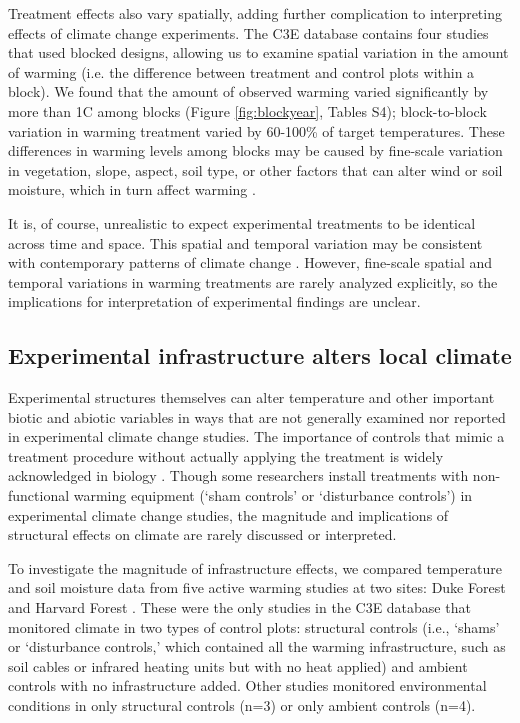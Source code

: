 \documentclass{article}
\begin{document}
\par Treatment effects also vary spatially, adding further complication to interpreting effects of climate change experiments. The C3E database contains four studies that used blocked designs, allowing us to examine spatial variation in the amount of warming (i.e. the difference between treatment and control plots within a block). We found that the amount of observed warming varied significantly by more than 1\degree C among blocks (Figure \ref{fig:blockyear}, Tables S4); block-to-block variation in warming treatment varied by 60-100\% of target temperatures. These differences in warming levels among blocks may be caused by fine-scale variation in vegetation, slope, aspect, soil type, or other factors that can alter wind or soil moisture, which in turn affect warming \citep{peterjohn1993,kimball2005,kimball2008,hoeppner2012,rollinson2015}. 
\par It is, of course, unrealistic to expect experimental treatments to be identical across time and space.  This spatial and temporal variation may be consistent with contemporary patterns of climate change  \citep{ipcc2013}. However, fine-scale spatial and temporal variations in warming treatments are rarely analyzed explicitly, so the implications for interpretation of experimental findings are unclear. %

\subsection* {Experimental infrastructure alters local climate}
Experimental structures themselves can alter temperature and other important biotic and abiotic variables in ways that are not generally examined nor reported in experimental climate change studies. The importance of controls that mimic a treatment procedure without actually applying the treatment is widely acknowledged in biology \citep[e.g.,][]{spector2001,johnson2002,quinn2002}. Though some researchers install treatments with non-functional warming equipment (`sham controls' or `disturbance controls') in experimental climate change studies, the magnitude and implications of structural effects on climate are rarely discussed or interpreted.
\par To investigate the magnitude of infrastructure effects, we compared temperature and soil moisture data from five active warming studies at two sites: Duke Forest and Harvard Forest \citep{farnsworth1995,clark2014a, marchin2015, pelini2011}. These were the only studies in the C3E database that monitored climate in two types of control plots: structural controls (i.e., `shams' or `disturbance controls,' which contained all the warming infrastructure, such as soil cables or infrared heating units but with no heat applied) and ambient controls with no infrastructure added. Other studies monitored environmental conditions in only structural controls (n=3) or only ambient controls (n=4).
\end{document}
